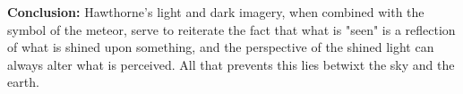 \documentclass[12pt,a4paper]{article}
\begin{document}
    \textbf{Conclusion:}
    Hawthorne's light and dark imagery, when combined with the symbol of the meteor,
    serve to reiterate the fact that what is "seen" is a reflection of what is shined
    upon something, and the perspective of the shined light can always alter what is
    perceived. All that prevents this lies betwixt the sky and the earth.
\end{document}
